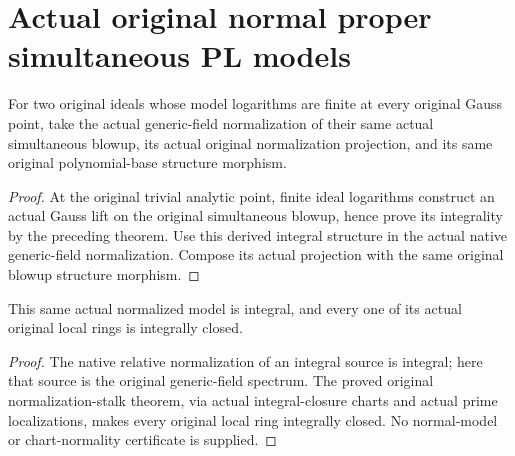 \section{Actual original normal proper simultaneous PL models}

\begin{definition}
\label{def:actual-original-normalized-simultaneous-model}
\leanok
{}
For two original ideals whose model logarithms are finite at every original
Gauss point, take the actual generic-field normalization of their same actual
simultaneous blowup, its actual original normalization projection, and its
same original polynomial-base structure morphism.
\end{definition}
\begin{proof}
At the original trivial analytic point, finite ideal logarithms construct an
actual Gauss lift on the original simultaneous blowup, hence prove its
integrality by the preceding theorem. Use this derived integral structure
in the actual native generic-field normalization. Compose its actual
projection with the same original blowup structure morphism.
\end{proof}

\begin{theorem}
\label{thm:actual-original-normalized-simultaneous-model-normal}
\leanok
{}
This same actual normalized model is integral, and every one of its actual
original local rings is integrally closed.
\end{theorem}
\begin{proof}
The native relative normalization of an integral source is integral; here
that source is the original generic-field spectrum. The proved original
normalization-stalk theorem, via actual integral-closure charts and actual
prime localizations, makes every original local ring integrally closed.
No normal-model or chart-normality certificate is supplied.
\end{proof}

